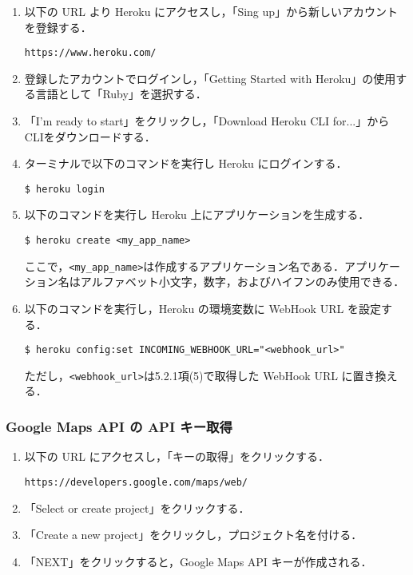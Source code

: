 \documentclass[12pt]{jsarticle}
\begin{document}
\begin{enumerate}
  \item 以下の URL より Heroku にアクセスし，「Sing up」から新しいアカウントを登録する．

    \verb|https://www.heroku.com/|
    
  \item 登録したアカウントでログインし，「Getting Started with Heroku」の使用する言語として「Ruby」を選択する．

  \item 「I'm ready to start」をクリックし，「Download Heroku CLI for...」からCLIをダウンロードする．

  \item ターミナルで以下のコマンドを実行し Heroku にログインする．

    \verb|$ heroku login|

  \item 以下のコマンドを実行し Heroku 上にアプリケーションを生成する．

    \verb|$ heroku create <my_app_name>|

    ここで，\verb|<my_app_name>|は作成するアプリケーション名である．アプリケーション名はアルファベット小文字，数字，およびハイフンのみ使用できる．

  \item 以下のコマンドを実行し，Heroku の環境変数に WebHook URL を設定する．

    \verb|$ heroku config:set INCOMING_WEBHOOK_URL="<webhook_url>"|

ただし，\verb|<webhook_url>|は5.2.1項(5)で取得した WebHook URL に置き換える．

\end{enumerate}

\subsubsection{Google Maps API の API キー取得}

\begin{enumerate}
  \item 以下の URL にアクセスし，「キーの取得」をクリックする．
 
    \verb|https://developers.google.com/maps/web/|

  \item 「Select or create project」をクリックする．
  \item 「Create a new project」をクリックし，プロジェクト名を付ける．
  \item 「NEXT」をクリックすると，Google Maps API キーが作成される．

\end{enumerate}
\end{document}
